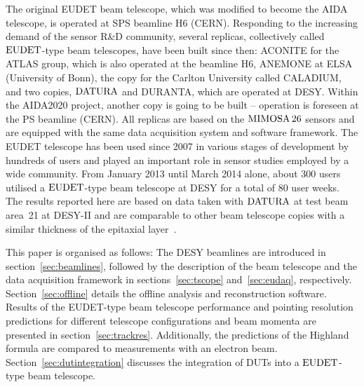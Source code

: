 The original EUDET beam telescope, which was modified to become the AIDA telescope, is operated at SPS beamline H6 (CERN).
Responding to the increasing demand of the sensor R\&D community, several replicas, collectively called $\textrm{EUDET}$-type beam telescopes, have been built since then:
 ACONITE for the ATLAS group, which is also operated at the beamline H6, ANEMONE at ELSA (University of Bonn), the copy for the Carlton University called CALADIUM, 
 and two copies, $\textrm{DATURA}$ and DURANTA, which are operated at DESY. 
 Within the AIDA2020 project, another copy is going to be built -- operation is foreseen at the PS beamline (CERN).
All replicas are based on the $\textrm{MIMOSA\,26}$ sensors and are equipped with the same data acquisition system and software framework. 
The EUDET telescope has been used since 2007 in various stages of development by hundreds of users and played an important role in sensor studies employed by a wide community. 
From January 2013 until March 2014 alone, about 300 users utilised a $\textrm{EUDET}$-type beam telescope at DESY for a total of 80 user weeks. 
The results reported here are based on data taken with $\textrm{DATURA}$ at test beam area~21 at {DESY-II} and are comparable to other beam telescope copies with
a similar thickness of the epitaxial layer~\cite{desy-tscopes-main}. 

This paper is organised as follows: 
The DESY beamlines are introduced in section~\ref{sec:beamlines}, followed by the description of the beam telescope
 and the data acquisition framework in sections~\ref{sec:tscope} and~\ref{sec:eudaq}, respectively.
Section~\ref{sec:offline} details the offline analysis and reconstruction software. 
Results of the EUDET-type beam telescope performance and pointing resolution predictions for different telescope configurations and beam momenta are presented in section~\ref{sec:trackres}. 
Additionally, the predictions of the Highland formula are compared to measurements with an electron beam. 
Section~\ref{sec:dutintegration} discusses the integration of DUTs into a $\textrm{EUDET}$-type beam telescope. 
